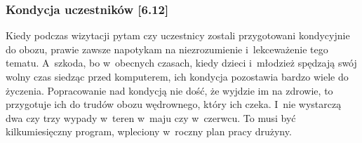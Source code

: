 \documentclass[a5paper,10pt,titlepage,twoside]{article}
\begin{document}
\subsubsection{Kondycja uczestników [6.12] \label{kondycja-uczestnikow}}
Kiedy podczas wizytacji pytam czy uczestnicy zostali przygotowani kondycyjnie do obozu, prawie zawsze napotykam na niezrozumienie i~lekceważenie tego tematu. A~szkoda, bo w~obecnych czasach, kiedy dzieci i~młodzież spędzają swój wolny czas siedząc przed komputerem, ich kondycja pozostawia bardzo wiele do życzenia. Popracowanie nad kondycją nie dość, że wyjdzie im na zdrowie, to przygotuje ich do trudów obozu wędrownego, który ich czeka. I~nie wystarczą dwa czy trzy wypady w~teren w~maju czy w~czerwcu. To musi być kilkumiesięczny program, wpleciony w~roczny plan pracy drużyny.
\\
\\
\end{document}
